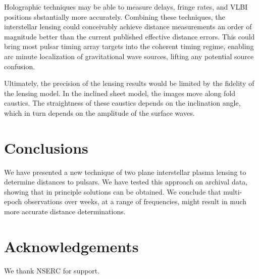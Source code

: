 \documentclass[useAMS,usenatbib]{mn2e}
\begin{document}
Holographic techniques\citep{2008MNRAS.388.1214W,2014MNRAS.440L..36P}
may be able to measure delays, fringe rates, and VLBI positions
sbstantially more accurately.  Combining these techniques, the
interstellar lensing could conceivably achieve distance measurements
an order of magnitude better than the current published effective
distance errors.  This could bring most pulsar timing array targets
into the coherent timing regime, enabling arc minute localization of
gravitational wave sources, lifting any potential source confusion.

Ultimately, the precision of the lensing results would be limited by
the fidelity of the lensing model.  In the inclined sheet model, the
images move along fold caustics.  The straightness of these caustics
depends on the inclination angle, which in turn depends on the
amplitude of the surface waves.

\section{Conclusions}

We have presented a new technique of two plane interstellar plasma
lensing to determine distances to pulsars.  We have tested this
approach on archival data, showing that in principle solutions can be
obtained.  We conclude that multi-epoch observations over weeks, at a
range of frequencies, might result in much more accurate distance
determinations.


\section{Acknowledgements}

We thank NSERC for support.


\newcommand{\araa}{ARA\&A}   %
\newcommand{\afz}{Afz}       %
\newcommand{\aj}{AJ}         %
\newcommand{\azh}{AZh}       %
\newcommand{\aaa}{A\&A}      %
\newcommand{\aas}{A\&AS}     %
\newcommand{\aar}{A\&AR}     %
\newcommand{\apj}{ApJ}       %
\newcommand{\apjs}{ApJS}     %
\newcommand{\apjl}{ApJ}      %
\newcommand{\apss}{Ap\&SS}   %
\newcommand{\baas}{BAAS}     %
\newcommand{\jaa}{JA\&A}     %
\newcommand{\mnras}{MNRAS}   %
\newcommand{\nat}{Nat}       %
\newcommand{\pasj}{PASJ}     %
\newcommand{\pasp}{PASP}     %
\newcommand{\paspc}{PASPC}   %
\newcommand{\qjras}{QJRAS}   %
\newcommand{\sci}{Sci}       %
\newcommand{\solphys}{Solar Physics}       %
\newcommand{\sova}{SvA}      %
\newcommand{\aap}{A\&A}
\newcommand\jcap{{J. Cosmology Astropart. Phys.}}%
\newcommand{\prd}{Phys. Rev. D}






\label{lastpage}
\end{document}

